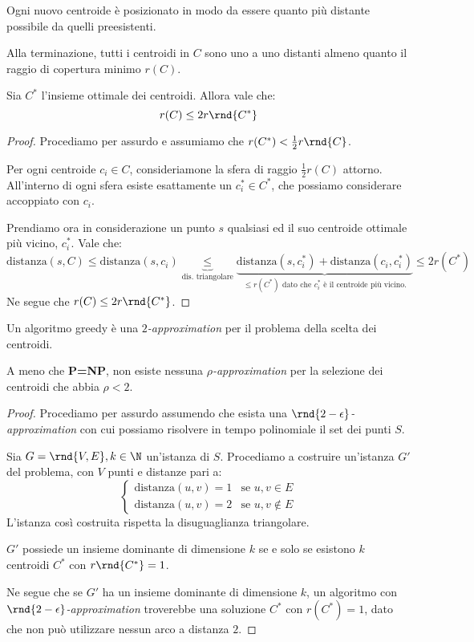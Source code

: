 \documentclass[\main/main.tex]{subfiles}
\begin{document}
Ogni nuovo centroide è posizionato in modo da essere quanto più distante possibile da quelli preesistenti.

\begin{property}
	Alla terminazione, tutti i centroidi in \(C\) sono uno a uno distanti almeno quanto il raggio di copertura minimo \(r(C)\).
\end{property}

\begin{lemma}
	Sia \(C^*\) l'insieme ottimale dei centroidi. Allora vale che:
	\[
		r(C) \leq 2r\rnd{C^*}
	\]
\end{lemma}
\begin{proof}
	Procediamo per assurdo e assumiamo che \(r(C^*) < \frac{1}{2}r\rnd{C}\).

	Per ogni centroide \(c_i \in C\), consideriamone la sfera di raggio \(\frac{1}{2} r(C)\) attorno. All'interno di ogni sfera esiste esattamente un \(c_i^* \in C^*\), che possiamo considerare accoppiato con \(c_i\).

	Prendiamo ora in considerazione un punto \(s\) qualsiasi ed il suo centroide ottimale più vicino, \(c_i^*\). Vale che:
	\[
		\text{distanza}(s, C) \leq \text{distanza}(s, c_i) \underbrace{\leq}_{\text{dis. triangolare}} \underbrace{\text{distanza}(s, c_i^*) + \text{distanza}(c_i, c_i^*)}_{\leq r(C^*) \text{ dato che \(c_i^*\) è il centroide più vicino.}} \leq 2r(C^*)
	\]
	Ne segue che \(r(C) \leq 2r\rnd{C^*}\).
\end{proof}
\begin{theorem}
	Un algoritmo greedy è una \textit{\(2\)-approximation} per il problema della scelta dei centroidi.
\end{theorem}
\begin{theorem}
	A meno che \textbf{P=NP}, non esiste nessuna \textit{\(\rho\)-approximation} per la selezione dei centroidi che abbia \(\rho<2\).
\end{theorem}
\begin{proof}
	Procediamo per assurdo assumendo che esista una \textit{\(\rnd{2-\epsilon}\)-approximation} con cui possiamo risolvere in tempo polinomiale il set dei punti \(S\).

	Sia \(G = \rnd{V, E}, k \in \N \) un'istanza di \(S\). Procediamo a costruire un'istanza \(G'\) del problema, con \(V\) punti e distanze pari a:
	\[
		\begin{cases}
			\text{distanza}(u,v) = 1 & \text{se \(u, v \in E\)}     \\
			\text{distanza}(u,v) = 2 & \text{se \(u, v \not\in E\)}
		\end{cases}
	\]
	L'istanza così costruita rispetta la disuguaglianza triangolare.

	\(G'\) possiede un insieme dominante di dimensione \(k\) se e solo se esistono \(k\) centroidi \(C^*\) con \(r\rnd{C^*} = 1\).

	Ne segue che se \(G'\) ha un insieme dominante di dimensione \(k\), un algoritmo con \textit{\(\rnd{2-\epsilon}\)-approximation} troverebbe una soluzione \(C^*\) con \(r(C^*) = 1\), dato che non può utilizzare nessun arco a distanza \(2\).
\end{proof}
\end{document}
